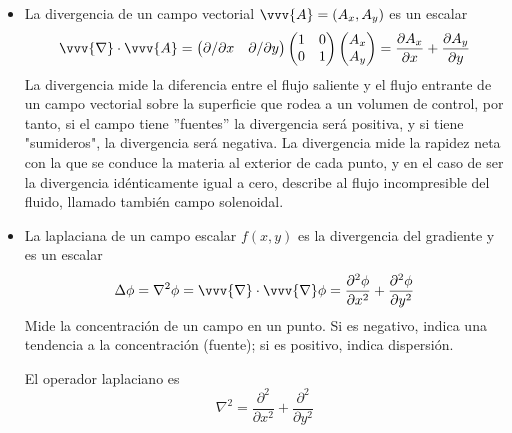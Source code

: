 \begin{itemize}
\item La divergencia de un campo vectorial $\vvv{A}=(A_x, A_y)$ es un escalar
  \begin{equation}\label{eq:R2-divergencia-cartesianas}
    \vvv{\nabla}\cdot\vvv{A}
    = \begin{pmatrix}
      \partial/\partial x & \partial/\partial y      
    \end{pmatrix}
    \begin{pmatrix}
      1 & 0\\
      0 & 1
    \end{pmatrix}
    \begin{pmatrix}
      A_x\\
      A_y
    \end{pmatrix}
    = \dfrac{\partial A_x}{\partial x}
    + \dfrac{\partial A_y}{\partial y}
  \end{equation}
  La divergencia mide la diferencia entre el flujo saliente y el flujo entrante de un
  campo vectorial sobre la superficie que rodea a un volumen de control, por tanto, si el
  campo tiene ''fuentes'' la divergencia será positiva, y si tiene "sumideros", la
  divergencia será negativa. La divergencia mide la rapidez neta con la que se conduce la
  materia al exterior de cada punto, y en el caso de ser la divergencia idénticamente
  igual a cero, describe al flujo incompresible del fluido, llamado también campo
  solenoidal.  
\item La laplaciana de un campo escalar $f(x,y)$ es la divergencia del gradiente y es un
  escalar
  \begin{equation}\label{eq:R2-gradiente-cartesianas}
    \Delta \phi
    =
    \nabla^2 \phi
    = \vvv{\nabla}\cdot\vvv{\nabla}\phi
    = \dfrac{\partial^2 \phi}{\partial x^2}
    + \dfrac{\partial^2 \phi}{\partial y^2}
  \end{equation}
Mide la concentración de un campo en un punto. Si es negativo, indica una tendencia a la
concentración (fuente); si es positivo, indica dispersión.

El operador laplaciano es
\begin{equation}
  \nabla^2
  = \dfrac{\partial^2}{\partial x^2}
  + \dfrac{\partial^2}{\partial y^2}
\end{equation}
\end{itemize}

